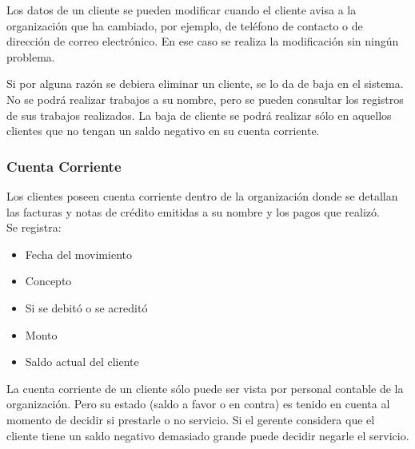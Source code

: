 \documentclass[12pt]{extarticle}
\begin{document}
\begin{spacing}{1.2}
        Los datos de un cliente se pueden modificar cuando el cliente avisa a la organización que ha cambiado, por ejemplo, de teléfono de contacto o de dirección de correo electrónico. En ese caso se realiza la modificación sin ningún problema.

        Si por alguna razón se debiera eliminar un cliente, se lo da de baja en el sistema. No se podrá realizar trabajos a su nombre, pero se pueden consultar los registros de sus trabajos realizados. La baja de cliente se podrá realizar sólo en aquellos clientes que no tengan un saldo negativo en su cuenta corriente.
        
        \subsubsection{Cuenta Corriente}
            Los clientes poseen cuenta corriente dentro de la organización donde se detallan las facturas y notas de crédito emitidas a su nombre y los pagos que realizó.\\
            Se registra:
            \begin{itemize}
                \item Fecha del movimiento
                \item Concepto
                \item Si se debitó o se acreditó
                \item Monto
                \item Saldo actual del cliente
            \end{itemize}

            La cuenta corriente de un cliente sólo puede ser vista por personal contable de la organización. Pero su estado (saldo a favor o en contra) es tenido en cuenta al momento de decidir si prestarle o no servicio. Si el gerente considera que el cliente tiene un saldo negativo demasiado grande puede decidir negarle el servicio.


        \pagebreak

\end{spacing}
\end{document}
